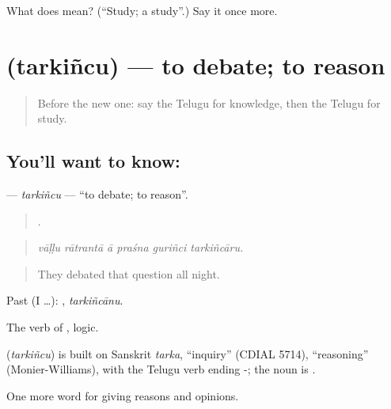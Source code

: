 \begin{tcolorbox}[breakable,colback=teal!4,colframe=teal!35!black,title={Before you move on}]
What does  mean? (\textquotedblleft{}Study; a study\textquotedblright{}.) Say it once more.
\end{tcolorbox}
\section[\texorpdfstring{\te{తర్కించు} (tarkiñcu)}{తర్కించు (tarkiñcu)}]{ (tarkiñcu) — to debate; to reason}

\label{lesson:TE-C415-tarkincu}



\begin{quote}
Before the new one: say the Telugu for knowledge, then the Telugu for study.
\end{quote}

\subsection*{You'll want to know: }
\textbf{} — \emph{tarkiñcu} — \textquotedblleft{}to debate; to reason\textquotedblright{}.

\begin{quote}
     .
\end{quote}

\begin{quote}
\emph{vāḷḷu rātrantā ā praśna guriñci tarkiñcāru.}
\end{quote}

\begin{quote}
They debated that question all night.
\end{quote}

Past (I …): , \emph{tarkiñcānu}.

The verb of , logic.

\begin{cousinweb}
\textbf{} (\emph{tarkiñcu}) is built on Sanskrit \emph{tarka}, \textquotedblleft{}inquiry\textquotedblright{} (CDIAL 5714), \textquotedblleft{}reasoning\textquotedblright{} (Monier-Williams), with the Telugu verb ending -; the noun is .
\end{cousinweb}

\begin{grammarlens}[title={What you've built}]
One more word for giving reasons and opinions.
\end{grammarlens}

